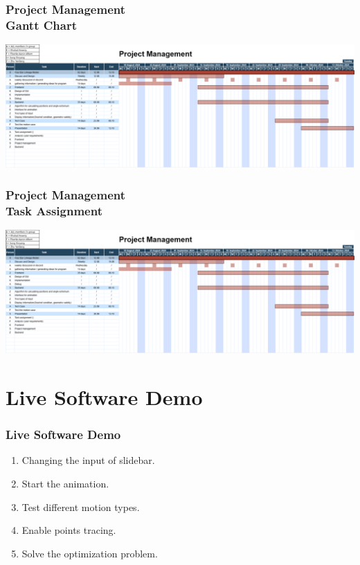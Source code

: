 \documentclass[ucs,10pt]{beamer}
\begin{document}
\begin{frame}
\frametitle{Project Management \\
	\small \color{rwth-blue} Gantt Chart}

	\begin{center}
		\includegraphics[width=\textwidth]{./Figures/project management 10-18.png}
	\end{center}
\end{frame}

\begin{frame}
\frametitle{Project Management \\
	\small \color{rwth-blue} Task Assignment}

	\begin{flushleft}
		\includegraphics[height=\textheight,keepaspectratio]{./Figures/project management 10-18.png}
	\end{flushleft}
\end{frame}

\section{Live Software Demo}

\begin{frame}
\frametitle{Live Software Demo}

    \begin{enumerate}
        \item Changing the input of slidebar.
        \item Start the animation.
        \item Test different motion types.
        \item Enable points tracing.
        \item Solve the optimization problem.
    \end{enumerate}

\end{frame}
\end{document}
